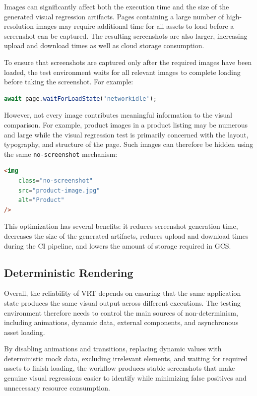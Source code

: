 Images can significantly affect both the execution time and the size of the generated visual regression artifacts. Pages containing a large number of high-resolution images may require additional time for all assets to load before a screenshot can be captured. The resulting screenshots are also larger, increasing upload and download times as well as cloud storage consumption.

To ensure that screenshots are captured only after the required images have been loaded, the test environment waits for all relevant images to complete loading before taking the screenshot. For example:

\begin{lstlisting}[language=TypeScript]
await page.waitForLoadState('networkidle');
\end{lstlisting}

However, not every image contributes meaningful information to the visual comparison. For example, product images in a product listing may be numerous and large while the visual regression test is primarily concerned with the layout, typography, and structure of the page. Such images can therefore be hidden using the same \texttt{no-screenshot} mechanism:

\begin{lstlisting}[language=html]
<img
    class="no-screenshot"
    src="product-image.jpg"
    alt="Product"
/>
\end{lstlisting}

This optimization has several benefits: it reduces screenshot generation time, decreases the size of the generated artifacts, reduces upload and download times during the \ac{CI} pipeline, and lowers the amount of storage required in \ac{GCS}.

\subsection{Deterministic Rendering}

Overall, the reliability of \ac{VRT} depends on ensuring that the same application state produces the same visual output across different executions. The testing environment therefore needs to control the main sources of non-determinism, including animations, dynamic data, external components, and asynchronous asset loading.

By disabling animations and transitions, replacing dynamic values with deterministic mock data, excluding irrelevant elements, and waiting for required assets to finish loading, the workflow produces stable screenshots that make genuine visual regressions easier to identify while minimizing false positives and unnecessary resource consumption.
